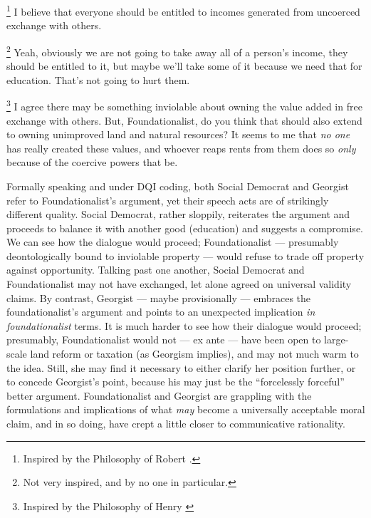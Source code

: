 \begin{dialogue}

\footnote{
	Inspired by the Philosophy of Robert \cite{Nozick1974}.
} 
I believe that everyone should be entitled to incomes generated from uncoerced exchange with others.

\footnote{
	Not very inspired, and by no one in particular.
} 
Yeah, obviously we are not going to take away all of a person's income, they should be entitled to it, but maybe we'll take some of it because we need that for education.
That's not going to hurt them.

\footnote{
	Inspired by the Philosophy of Henry \cite{George1879}
} 
I agree there may be something inviolable about owning the value added in free exchange with others.
But, Foundationalist, do you think that should also extend to owning unimproved land and natural resources?
It seems to me that \emph{no one} has really created these values, and whoever reaps rents from them does so \emph{only} because of the coercive powers that be.
\end{dialogue}

Formally speaking and under \gls{DQI} coding, both Social Democrat and Georgist refer to Foundationalist's argument, yet their speech acts are of strikingly different quality.
Social Democrat, rather sloppily, reiterates the argument and proceeds to balance it with another good (education) and suggests a compromise.
We can see how the dialogue would proceed; Foundationalist --- presumably deontologically bound to inviolable property --- would refuse to trade off property against opportunity.
Talking past one another, Social Democrat and Foundationalist may not have exchanged, let alone agreed on universal validity claims.
By contrast, Georgist --- maybe provisionally --- embraces the foundationalist's argument and points to an unexpected implication \emph{in foundationalist} terms.
It is much harder to see how their dialogue would proceed; presumably, Foundationalist would not --- ex ante --- have been open to large-scale land reform or taxation (as Georgism implies), and may not much warm to the idea.
Still, she may find it necessary to either clarify her position further, or to concede Georgist's point, because his may just be the ``forcelessly forceful'' better argument.
Foundationalist and Georgist are grappling with the formulations and implications of what \emph{may} become a universally acceptable moral claim, and in so doing, have crept a little closer to communicative rationality.

